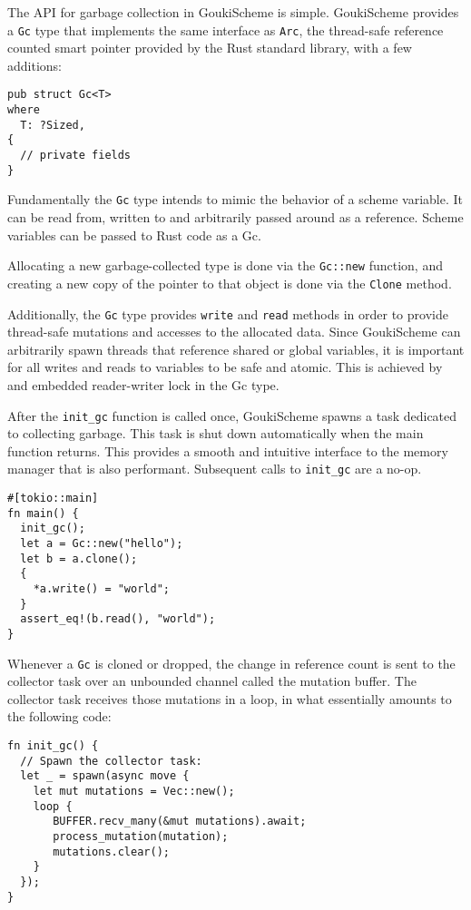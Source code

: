 \documentclass[sigplan,review,anonymous]{acmart}
\begin{document}
The API for garbage collection in GoukiScheme is simple. GoukiScheme provides a
\texttt{Gc} type that implements the same interface as \texttt{Arc}\cite{arc},
the thread-safe reference counted smart pointer provided by the Rust standard
library, with a few additions:

\begin{verbatim}
pub struct Gc<T>
where
  T: ?Sized,
{
  // private fields
}
\end{verbatim}

Fundamentally the \texttt{Gc} type intends to mimic the behavior of a scheme variable.
It can be read from,  written to and arbitrarily passed around as a reference. Scheme
variables can be passed to Rust code as a Gc. 

Allocating a new garbage-collected type is done via the \texttt{Gc::new} function, and
creating a new copy of the pointer to that object is done via the \texttt{Clone}
method.

Additionally, the \texttt{Gc} type provides \texttt{write} and \texttt{read}
methods in order to provide thread-safe mutations and accesses to the allocated
data. Since GoukiScheme can arbitrarily spawn threads that reference shared or
global variables, it is important for all writes and reads to variables to be safe
and atomic. This is achieved by and embedded reader-writer lock in the Gc type.

After the \texttt{init\_gc} function is called once, GoukiScheme spawns a task
dedicated to collecting garbage. This task is shut down automatically when the
main function returns. This provides a smooth and intuitive interface to the
memory manager that is also performant. Subsequent calls to \texttt{init\_gc}
are a no-op.

\begin{verbatim}
#[tokio::main]
fn main() {
  init_gc();
  let a = Gc::new("hello");
  let b = a.clone();
  {
    *a.write() = "world";
  }
  assert_eq!(b.read(), "world");
}
\end{verbatim}

Whenever a \texttt{Gc} is cloned or dropped, the change in reference count is
sent to the collector task over an unbounded channel called the mutation buffer.
The collector task receives those mutations in a loop, in what essentially amounts
to the following code:

\begin{verbatim}
fn init_gc() {
  // Spawn the collector task:
  let _ = spawn(async move {
    let mut mutations = Vec::new();
    loop {
       BUFFER.recv_many(&mut mutations).await;
       process_mutation(mutation);
       mutations.clear();
    } 
  });
}  
\end{verbatim}
\end{document}
